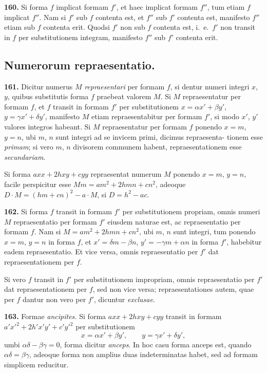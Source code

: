 \documentclass[12pt,a4paper]{article}
\begin{document}
\textbf{160.}
Si forma $f$ implicat formam $f'$, et haec implicat formam $f''$, tum etiam
$f$ implicat $f''$. Nam si $f'$ sub $f$ contenta est, et $f''$ sub $f'$ contenta est, manifesto
$f''$ etiam sub $f$ contenta erit. Quodsi $f'$ non sub $f$ contenta est, i.~e.\ $f'$
non transit in $f$ per substitutionem integram, manifesto $f''$ sub $f'$ contenta erit.

\subsection*{Numerorum repraesentatio.}

\textbf{161.}
Dicitur numerus $M$ \textit{repraesentari} per formam $f$, si dentur numeri
integri $x$, $y$, quibus substitutis forma $f$ praebeat valorem $M$. Si $M$ repraesentatur
per formam $f$, et $f$ transit in formam $f'$ per substitutionem $x = \alpha x' + \beta y'$,
$y = \gamma x' + \delta y'$, manifesto $M$ etiam repraesentabitur per formam $f'$, si modo
$x'$, $y'$ valores integros habeant. Si $M$ repraesentatur per formam $f$ ponendo
$x = m$, $y = n$, ubi $m$, $n$ sunt integri ad se invicem primi, dicimus repraesenta-
tionem esse \textit{primam}; si vero $m$, $n$ divisorem communem habent, repraesentationem
esse \textit{secundariam}.

Si forma $axx + 2hxy + cyy$ repraesentat numerum $M$ ponendo $x = m$,
$y = n$, facile perspicitur esse $Mm = am^2 + 2hmn + cn^2$, adeoque
$D \cdot M = (hm + cn)^2 - a \cdot M$, si $D = h^2 - ac$.

\textbf{162.}
Si forma $f$ transit in formam $f'$ per substitutionem propriam, omnis
numeri $M$ repraesentatio per formam $f'$ eiusdem naturae est, ac repraesentatio
per formam $f$. Nam si $M = am^2 + 2hmn + cn^2$, ubi $m$, $n$ sunt integri,
tum ponendo $x = m$, $y = n$ in forma $f$, et $x' = \delta m - \beta n$,
$y' = -\gamma m + \alpha n$ in forma $f'$, habebitur eadem repraesentatio. Et vice versa,
omnis repraesentatio per $f'$ dat repraesentationem per $f$.

Si vero $f$ transit in $f'$ per substitutionem impropriam, omnis repraesentatio
per $f'$ dat repraesentationem per $f$, sed non vice versa; repraesentationes autem,
quae per $f$ dantur non vero per $f'$, dicuntur \textit{exclusae}.

\textbf{163.}
Formae \textit{ancipites.} Si forma $axx + 2hxy + cyy$ transit in formam
$a'x'^2 + 2h'x'y' + c'y'^2$ per substitutionem
\[
x = \alpha x' + \beta y', \qquad y = \gamma x' + \delta y',
\]
umbi $\alpha\delta - \beta\gamma = 0$, forma dicitur \textit{anceps}. In hoc casu forma anceps est, quando
$\alpha\delta = \beta\gamma$, adeoque forma non amplius duas indeterminatas habet, sed ad formam
simplicem reducitur.
\end{document}
